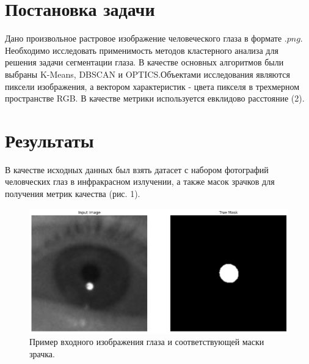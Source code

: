 \documentclass{article}
\begin{document}
\section{Постановка задачи}
Дано произвольное растровое изображение человеческого глаза в формате $.png$. Необходимо исследовать применимость методов кластерного анализа для решения задачи сегментации глаза. В качестве основных алгоритмов были выбраны K-Means, DBSCAN и OPTICS.Объектами исследования являются пиксели изображения, а вектором характеристик - цвета пикселя в трехмерном пространстве RGB. В качестве метрики используется евклидово расстояние (2).

\section{Результаты}
В качестве исходных данных был взять датасет с набором фотографий человческих глаз в  инфракрасном излучении, а также масок зрачков для получения метрик качества (рис. 1). 

\begin{figure}[h]
\centering
\includegraphics[width=0.8\linewidth]{input_image.png}
\caption{Пример входного изображения глаза и соответствующей маски зрачка.}
\label{fig:mpr}
\end{figure}
\end{document}
